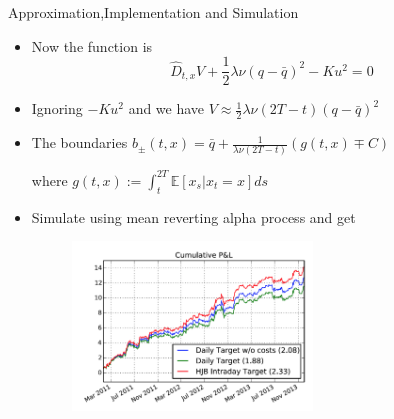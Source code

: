 \begin{frame}{Approximation,Implementation and Simulation}
\begin{itemize}

\item Now the function is 
$$
\hat D_{t,x}V+\frac12 \lambda \nu (q-\bar q)^2-Ku^2=0
$$
\item Ignoring $-Ku^2$ and we have
$
V \approx \frac{1}{2} \lambda \nu (2T-t)(q-\bar q)^2
$

\item The boundaries
$b_{\pm} (t,x)=\bar q +\frac{1}{\lambda \nu (2T-t)}(g(t,x) \mp  C)$

where $g(t,x):=\int_t^{2T}\mathbb E[x_s|x_t=x]ds$
\item Simulate using mean reverting alpha process and get


\begin{figure}
\centering

\centering
\includegraphics[height=4.5cm]{img/p&l1.png}

\end{figure}

\end{itemize}
\end{frame}



